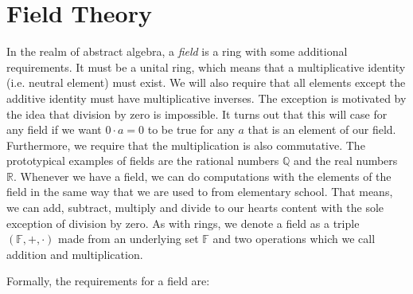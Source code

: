 \section{Field Theory}
In the realm of abstract algebra, a \emph{field} is a ring with some additional requirements. It must be a unital ring, which means that a multiplicative identity (i.e. neutral element) must exist. We will also require that all elements except the additive identity must have multiplicative inverses. The exception is motivated by the idea that division by zero is impossible. It turns out that this will case for any field if we want $0 \cdot a = 0$ to be true for any $a$ that is an element of our field. Furthermore, we require that the multiplication is also commutative. The prototypical examples of fields are the rational numbers $\mathbb{Q}$ and the real numbers $\mathbb{R}$. Whenever we have a field, we can do computations with the elements of the field in the same way that we are used to from elementary school. That means, we can add, subtract, multiply and divide to our hearts content with the sole exception of division by zero. As with rings, we denote a field as a triple $(\mathbb{F}, +, \cdot)$ made from an underlying set $\mathbb{F}$ and two operations which we call addition and multiplication.

Formally, the requirements for a field are:










